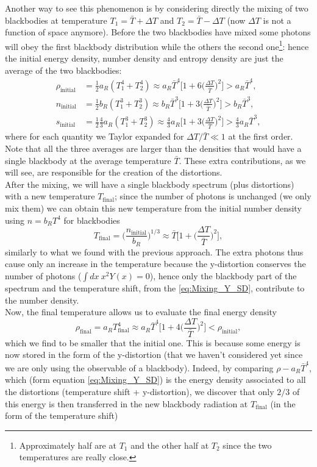 Another way to see this phenomenon is by considering directly the mixing of two blackbodies at temperature $T_1=\bar T+\Delta T$ and $T_2=\bar T-\Delta T$ (now $\Delta T$ is not a function of space anymore). Before the two blackbodies have mixed some photons will obey the first blackbody distribution while the others the second one\footnote{Approximately half are at $T_1$ and the other half at $T_2$ since the two temperatures are really close.}: hence the initial energy density, number density and entropy density are just the average of the two blackbodies:
\begin{align}\label{eq:Mix_rho_initial}
    \rho_\text{initial}&= \frac{1}{2}a_R(T_1^4+T_2^4)\approx a_R\bar T^4\bigg[1+6\bigg(\frac{\Delta T}{\bar T}\bigg)^2\bigg]>a_R\bar T^4,\\\label{eq:Mix_n_initial}
    n_\text{initial}&= \frac{1}{2}b_R(T_1^3+T_2^3)\approx b_R\bar T^3\bigg[1+3\bigg(\frac{\Delta T}{\bar T}\bigg)^2\bigg]>b_R\bar T^3,\\\label{eq:Mix_s_initial}
    s_\text{initial}&= \frac{1}{2}\frac{4}{3}a_R( T_1^3+T_2^3)\approx\frac{4}{3}a_R\bigg[1+3\bigg(\frac{\Delta T}{\bar T}\bigg)^2\bigg]>\frac{4}{3}a_R\bar T^3,
\end{align}
where for each quantity we Taylor expanded for $\Delta T/\bar T\ll 1$ at the first order.\\
Note that all the three averages are larger than the densities that would have a single blackbody at the average temperature $\bar T$. These extra contributions, as we will see, are responsible for the creation of the distortions.\\After the mixing, we will have a single blackbody spectrum (plus distortions) with a new temperature $T_\text{final}$; since the number of photons is unchanged (we only mix them) we can obtain this new temperature from the initial number density using $n=b_RT^4$ for blackbodies
$$T_\text{final}=\bigg(\frac{n_\text{initial}}{b_R}\bigg)^{1/3}\approx\bar T\bigg[1+\bigg(\frac{\Delta T}{\bar T}\bigg)^2\bigg],$$ similarly to what we found with the previous approach. The extra photons thus cause only an increase in the temperature because the y-distortion conserves the number of photons ($\int dx\ x^2Y(x)=0$), hence only the blackbody part of the spectrum and the temperature shift, from the \eqref{eq:Mixing_Y_SD}, contribute to the number density.\\
Now, the final temperature allows us to evaluate the final energy density
$$\rho_\text{final}=a_RT_\text{final}^4\approx a_R\bar T^4\bigg[1+4\bigg(\frac{\Delta T}{\bar T}\bigg)^2\bigg]<\rho_\text{initial},$$ which we find to be smaller that the initial one. This is because some energy is now stored in the form of the y-distortion (that we haven't considered yet since we are only using the observable of a blackbody). Indeed, by comparing $\rho-a_R\bar T^4$, which (form equation \ref{eq:Mixing_Y_SD}) is the energy density associated to all the distortions (temperature shift + y-distortion), we discover that only $2/3$ of this energy is then transferred in the new blackbody radiation at $T_\text{final}$ (in the form of the temperature shift)
